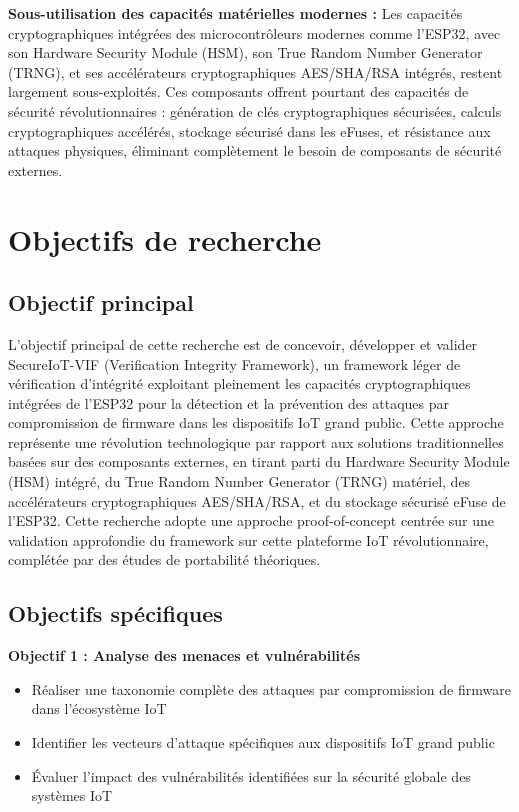 \textbf{Sous-utilisation des capacités matérielles modernes :} Les capacités cryptographiques intégrées des microcontrôleurs modernes comme l'ESP32, avec son Hardware Security Module (HSM), son True Random Number Generator (TRNG), et ses accélérateurs cryptographiques AES/SHA/RSA intégrés, restent largement sous-exploités. Ces composants offrent pourtant des capacités de sécurité révolutionnaires : génération de clés cryptographiques sécurisées, calculs cryptographiques accélérés, stockage sécurisé dans les eFuses, et résistance aux attaques physiques, éliminant complètement le besoin de composants de sécurité externes.

\section{Objectifs de recherche}

\subsection{Objectif principal}

L'objectif principal de cette recherche est de concevoir, développer et valider SecureIoT-VIF (Verification Integrity Framework), un framework léger de vérification d'intégrité exploitant pleinement les capacités cryptographiques intégrées de l'ESP32 pour la détection et la prévention des attaques par compromission de firmware dans les dispositifs IoT grand public. Cette approche représente une révolution technologique par rapport aux solutions traditionnelles basées sur des composants externes, en tirant parti du Hardware Security Module (HSM) intégré, du True Random Number Generator (TRNG) matériel, des accélérateurs cryptographiques AES/SHA/RSA, et du stockage sécurisé eFuse de l'ESP32. Cette recherche adopte une approche proof-of-concept centrée sur une validation approfondie du framework sur cette plateforme IoT révolutionnaire, complétée par des études de portabilité théoriques.

\subsection{Objectifs spécifiques}

\textbf{Objectif 1 : Analyse des menaces et vulnérabilités}
\begin{itemize}
    \item Réaliser une taxonomie complète des attaques par compromission de firmware dans l'écosystème IoT
    \item Identifier les vecteurs d'attaque spécifiques aux dispositifs IoT grand public
    \item Évaluer l'impact des vulnérabilités identifiées sur la sécurité globale des systèmes IoT
\end{itemize}

